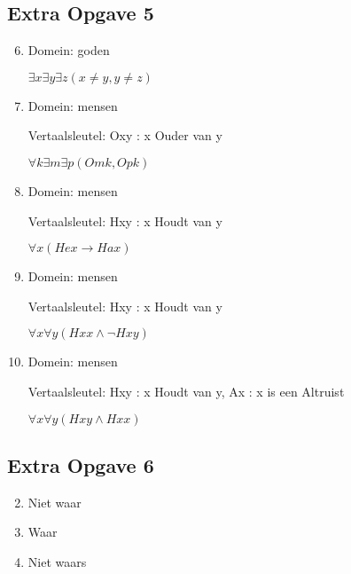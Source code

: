 \documentclass[11pt]{article}
\newcommand{\E}{\exists}
\newcommand{\A}{\forall}
\begin{document}
\subsection*{Extra Opgave 5}
\begin{enumerate}[label=\alph*]
  \setcounter{enumi}{5}
  \item Domein: goden

  $\E x \E y \E z (x \neq y, y \neq z)$

  \setcounter{enumi}{8}
  \item Domein: mensen

  Vertaalsleutel: Oxy : x Ouder van y

  $\A k \E m \E p (Omk, Opk)$

  \setcounter{enumi}{12}
  \item Domein: mensen

  Vertaalsleutel: Hxy : x Houdt van y

  $\A x (Hex \rightarrow Hax)$

  \setcounter{enumi}{17}
  \item Domein: mensen

  Vertaalsleutel: Hxy : x Houdt van y

  $\A x \A y(Hxx \wedge \neg Hxy)$

  \setcounter{enumi}{18}
  \item Domein: mensen

  Vertaalsleutel: Hxy : x Houdt van y, Ax : x is een Altruist

  $\A x \A y (Hxy \wedge Hxx)$

\end{enumerate}


\subsection*{Extra Opgave 6}
\begin{enumerate}[label=\roman*]
  \setcounter{enumi}{1}
  \item Niet waar

  \setcounter{enumi}{3}
  \item Waar

  \setcounter{enumi}{5}
  \item Niet waars

\end{enumerate}
\end{document}
